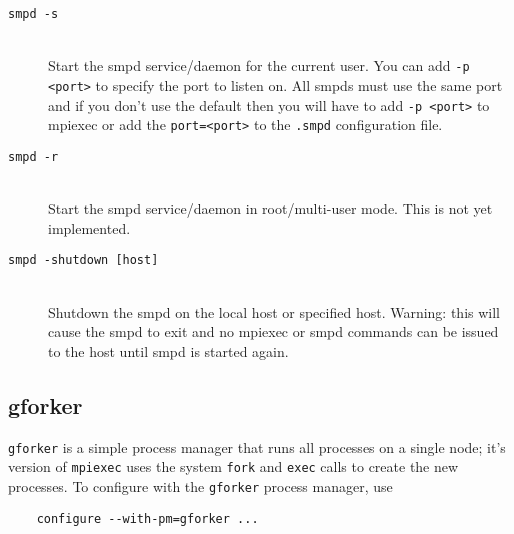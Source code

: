 \documentclass[dvipdfm,11pt]{article}
\begin{document}
\begin{description}
\item[\texttt{smpd -s}]\mbox{}\\
Start the smpd service/daemon for the current user.  You can add 
\texttt{-p <port>} to specify the port to listen on.  All smpds must use
the same port and if you don't use the default then you will have to
add \texttt{-p <port>} to mpiexec or add the \texttt{port=<port>} to the 
\texttt{.smpd} configuration file.

\item[\texttt{smpd -r}]\mbox{}\\
Start the smpd service/daemon in root/multi-user mode.  This is not yet
implemented.

\item[\texttt{smpd -shutdown [host]}]\mbox{}\\
Shutdown the smpd on the local host or specified host.  Warning: this will
cause the smpd to exit and no mpiexec or smpd commands can be issued to the
host until smpd is started again.

%
%

\end{description}

\subsection{gforker}
\label{sec:forker}
\texttt{gforker} is a simple process manager that runs all processes on
a single node; it's version of \texttt{mpiexec} uses the system
\texttt{fork} and \texttt{exec} calls to create the new processes.
To configure with the \texttt{gforker} process manager, use
\begin{verbatim}
    configure --with-pm=gforker ...
\end{verbatim}
\end{document}
